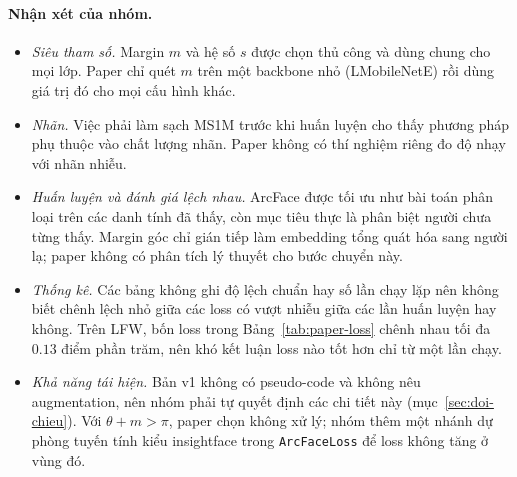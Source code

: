 \documentclass[a4paper,12pt]{article}
\begin{document}
\paragraph{Nhận xét của nhóm.}
\begin{itemize}
    \item \emph{Siêu tham số.} Margin $m$ và hệ số $s$ được chọn thủ công và dùng chung cho mọi lớp. Paper chỉ quét $m$ trên một backbone nhỏ (LMobileNetE) rồi dùng giá trị đó cho mọi cấu hình khác.
    \item \emph{Nhãn.} Việc phải làm sạch MS1M trước khi huấn luyện cho thấy phương pháp phụ thuộc vào chất lượng nhãn. Paper không có thí nghiệm riêng đo độ nhạy với nhãn nhiễu.
    \item \emph{Huấn luyện và đánh giá lệch nhau.} ArcFace được tối ưu như bài toán phân loại trên các danh tính đã thấy, còn mục tiêu thực là phân biệt người chưa từng thấy. Margin góc chỉ gián tiếp làm embedding tổng quát hóa sang người lạ; paper không có phân tích lý thuyết cho bước chuyển này.
    \item \emph{Thống kê.} Các bảng không ghi độ lệch chuẩn hay số lần chạy lặp nên không biết chênh lệch nhỏ giữa các loss có vượt nhiễu giữa các lần huấn luyện hay không. Trên LFW, bốn loss trong Bảng~\ref{tab:paper-loss} chênh nhau tối đa $0.13$ điểm phần trăm, nên khó kết luận loss nào tốt hơn chỉ từ một lần chạy.
    \item \emph{Khả năng tái hiện.} Bản v1 không có pseudo-code và không nêu augmentation, nên nhóm phải tự quyết định các chi tiết này (mục~\ref{sec:doi-chieu}). Với $\theta + m > \pi$, paper chọn không xử lý; nhóm thêm một nhánh dự phòng tuyến tính kiểu insightface trong \texttt{ArcFaceLoss} để loss không tăng ở vùng đó.
\end{itemize}
\end{document}
